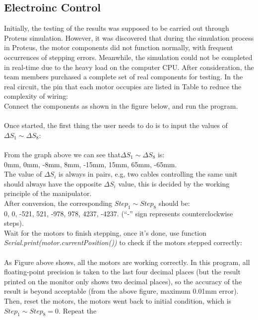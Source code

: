 \subsection{Electroinc Control}
Initially, the testing of the results was supposed to be carried out through Proteus simulation. However, 
it was discovered that during the simulation process in Proteus, the motor components did not function normally, 
with frequent occurrences of stepping errors. Meanwhile, the simulation could not be completed in real-time 
due to the heavy load on the computer CPU. After consideration, the team members purchased a complete set of real 
components for testing. In the real circuit, the pin that each motor occupies are listed in Table to 
reduce the complexity of wiring: \\

Connect the components as shown in the figure below, and run the program. \\
\\
Once started, the first thing the user needs to do is to input the values of $\Delta S_1 \sim \Delta S_8$: \\
\\
From the graph above we can see that$\Delta S_1 \sim \Delta S_8$ is:\\ 0mm, 0mm, -8mm, 8mm, -15mm, 15mm, 65mm, 
-65mm.\\ The value of $\Delta S_i$ is always in pairs, e.g, two cables controlling the same unit should always have 
the opposite $\Delta S_i$ value, this is decided by the working principle of the manipulator. \\
After conversion, the corresponding $Step_1 \sim Step_8$ should be: \\0, 0, -521, 521, -978, 978, 4237, -4237. 
(“-” sign represents counterclockwise steps). \\
Wait for the motors to finish stepping, once it's done, use function \emph{Serial.print(motor.currentPosition())} to 
check if the motors stepped correctly: \\
\\
As Figure above shows, all the motors are working correctly. In this program, all floating-point precision 
is taken to the last four decimal places (but the result printed on the monitor only shows two decimal places), 
so the accuracy of the result is beyond acceptable (from the above figure, maximum 0.01mm error).\\
Then, reset the motors, the motors went back to initial condition, which is $Step_1 \sim Step_8=0$. Repeat the 
